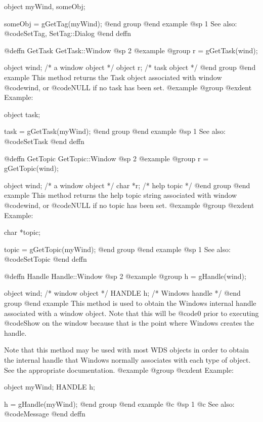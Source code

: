 object  myWind, someObj;

someObj = gGetTag(myWind);
@end group
@end example
@sp 1
See also:  @code{SetTag, SetTag::Dialog}
@end deffn












@deffn {GetTask} GetTask::Window
@sp 2
@example
@group
r = gGetTask(wind);

object  wind;   /*  a window object  */
object  r;      /*  task object      */
@end group
@end example
This method returns the Task object associated with window
@code{wind}, or @code{NULL} if no task has been set.
@example
@group
@exdent Example:

object  task;

task = gGetTask(myWind);
@end group
@end example
@sp 1
See also:  @code{SetTask}
@end deffn




@deffn {GetTopic} GetTopic::Window
@sp 2
@example
@group
r = gGetTopic(wind);

object  wind;   /*  a window object  */
char   *r;      /*  help topic       */
@end group
@end example
This method returns the help topic string associated with window
@code{wind}, or @code{NULL} if no topic has been set.
@example
@group
@exdent Example:

char  *topic;

topic = gGetTopic(myWind);
@end group
@end example
@sp 1
See also:  @code{SetTopic}
@end deffn




@deffn {Handle} Handle::Window
@sp 2
@example
@group
h = gHandle(wind);

object  wind;   /*  window object  */
HANDLE  h;      /*  Windows handle */
@end group
@end example
This method is used to obtain the Windows internal handle associated with
a window object.  Note that this will be @code{0} prior to executing
@code{Show} on the window because that is the point where Windows creates
the handle.

Note that this method may be used with most WDS objects in order to obtain
the internal handle that Windows normally associates with each type of object.
See the appropriate documentation.
@example
@group
@exdent Example:

object  myWind;
HANDLE  h;

h = gHandle(myWind);
@end group
@end example
@c @sp 1
@c See also:  @code{Message}
@end deffn






